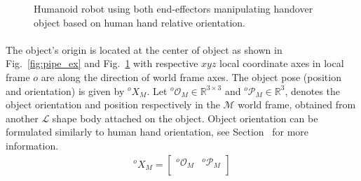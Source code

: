 \documentclass[a4paper, 12pt, oneside]{Thesis}  %
\begin{document}


\begin{figure}[hpt]
	\caption{Humanoid robot using both end-effectors manipulating handover object based on human hand relative orientation.}
	\label{fig:pipe_ori}
\end{figure}

\paragraph*{}
The object's origin is located at the center of object as shown in Fig.~\ref{fig:pipe_ex} and Fig.~\ref{fig:pipe_ori} with respective $xyz$ local coordinate axes in local frame $o$ are along the direction of world frame axes. The object pose (position and orientation) is given by ${}^{o}{X}_M$. Let ${{}^{o}\mathcal{O}_M} \in \mathbb{R}^{3\times3}$ and ${{}^{o}\mathcal{P}_M} \in \mathbb{R}^{3}$, denotes the object orientation and position respectively in the $\mathcal{M}$ world frame, obtained from another $\mathcal{L}$ shape body attached on the object. Object orientation can be formulated similarly to human hand orientation, see Section~ for more information.
\begin{gather}\label{X_M_o}
{}^{o}{X}_M =
\left[\begin{array}{cc}
{}^{o}\mathcal{O}_M & {}^{o}\mathcal{P}_M \\
\end{array}\right]
\end{gather}
\end{document}
